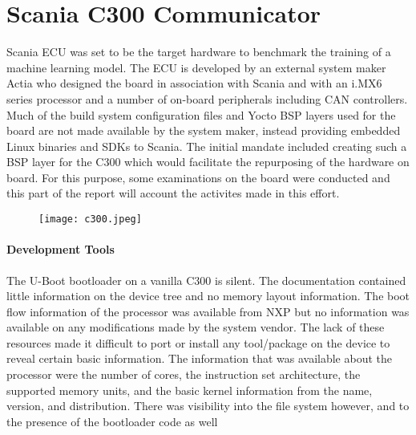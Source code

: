 \chapter{Scania C300 Communicator} \label{rtc-c300}

Scania ECU was set to be the target hardware to benchmark the training of a machine learning model. The ECU is developed by an external system maker Actia who designed the board in association with Scania and with an i.MX6 series processor and a number of on-board peripherals including CAN controllers. Much of the build system configuration files and Yocto BSP layers used for the board are not made available by the system maker, instead providing embedded Linux binaries and SDKs to Scania. The initial mandate included creating such a BSP layer for the C300 which would facilitate the repurposing of the hardware on board. For this purpose, some examinations on the board were conducted and this part of the report will account the activites made in this effort.

\begin{figure}[h]
	\centering
	\texttt{[image: c300.jpeg]}
\end{figure}

\subsubsection*{Development Tools}

The U-Boot bootloader on a vanilla C300 is silent. The documentation contained little information on the device tree and no memory layout information. The boot flow information of the processor was available from NXP but no information was available on any modifications made by the system vendor. The lack of these resources made it difficult to port or install any tool/package on the device to reveal certain basic information. The information that was available about the processor were the number of cores, the instruction set architecture, the supported memory units, and the basic kernel information from the name, version, and distribution. There was visibility into the file system however, and to the presence of the bootloader code as well


